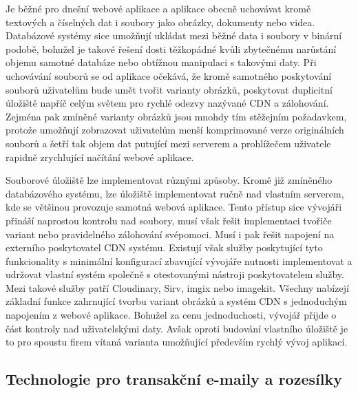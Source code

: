 	Je běžné pro dnešní webové aplikace a aplikace obecně uchovávat kromě textových a číselných dat i soubory jako
	obrázky, dokumenty nebo videa.
	Databázové systémy sice umožňují ukládat mezi běžné data i soubory v binární podobě, bohužel je takové řešení dosti
	těžkopádné kvůli zbytečnému narůstání objemu samotné databáze nebo obtížnou manipulaci s takovými daty.
	Při uchovávání souborů se od aplikace očekává, že kromě samotného poskytování souborů uživatelům bude umět tvořit
	varianty obrázků, poskytovat duplicitní úložiště napříč celým světem pro rychlé odezvy nazývané \noindent\Ac{CDN} a zálohování.
	Zejména pak zmíněné varianty obrázků jsou mnohdy tím stěžejním požadavkem, protože umožňují zobrazovat uživatelům menší
	komprimované verze originálních souborů a šetří tak objem dat putující mezi serverem a prohlížečem uživatele rapidně
	zrychlující načítání webové aplikace.

	Souborové úložiště lze implementovat různými způsoby.
	Kromě již zmíněného databázového systému, lze úložiště implementovat ručně nad vlastním serverem, kde se většinou
	provozuje samotná webová aplikace.
	Tento přístup sice vývojáři přináší naprostou kontrolu nad soubory, musí však řešit implementaci tvořiče variant
	nebo pravidelného zálohování svépomoci.
	Musí i pak řešit napojení na externího poskytovatel \noindent\Ac{CDN} systému.
	Existují však služby poskytující tyto funkcionality s minimální konfigurací zbavující vývojáře nutnosti implementovat
	a udržovat vlastní systém společně s otestovanými nástroji poskytovatelem služby.
	Mezi takové služby patří Cloudinary, Sirv, imgix nebo imagekit.
	Všechny nabízejí základní funkce zahrnující tvorbu variant obrázků a systém \Ac{CDN} s jednoduchým napojením
	z webové aplikace.
	Bohužel za cenu jednoduchosti, vývojář přijde o část kontroly nad uživatelskými daty.
	Avšak oproti budování vlastního úložiště je to pro spoustu firem vítaná varianta umožňující především rychlý vývoj
	aplikací.

	\subsection{Technologie pro transakční e-maily a rozesílky}

